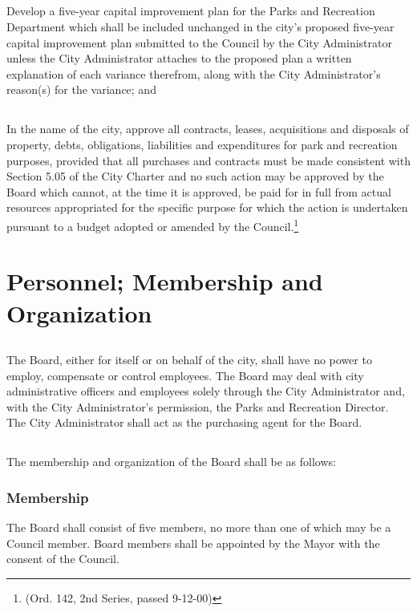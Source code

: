 \subsection{}
Develop a five-year capital improvement plan for the Parks and Recreation Department which shall be included unchanged in the city’s proposed five-year capital improvement plan submitted to the Council by the City Administrator unless the City Administrator attaches to the proposed plan a written explanation of each variance therefrom, along with the City Administrator’s reason(s) for the variance; and
\subsection{}
In the name of the city, approve all contracts, leases, acquisitions and disposals of property, debts, obligations, liabilities and expenditures for park and recreation purposes, provided that all purchases and contracts must be made consistent with Section 5.05 of the City Charter and no such action may be approved by the Board which cannot, at the time it is approved, be paid for in full from actual resources appropriated for the specific purpose for which the action is undertaken pursuant to a budget adopted or amended by the Council.\footnote{(Ord. 142, 2nd Series, passed 9-12-00)}

\section{Personnel; Membership and Organization}
\subsection{}
The Board, either for itself or on behalf of the city, shall have no power to employ, compensate or control employees. The Board may deal with city administrative officers and employees solely through the City Administrator and, with the City Administrator’s permission, the Parks and Recreation Director. The City Administrator shall act as the purchasing agent for the Board.
\subsection{}
The membership and organization of the Board shall be as follows:
\subsubsection{Membership}
The Board shall consist of five members, no more than one of which may be a Council member. Board members shall be appointed by the Mayor with the consent of the Council.
